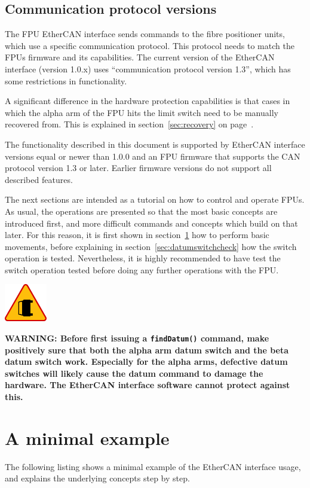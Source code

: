 \documentclass[11pt,a4paper]{report}
\newenvironment{warning}{\begin{framed}\includegraphics[width=5em]{accident-area-ahead.png}
}{\end{framed}}
\begin{document}
\subsection{Communication protocol versions}
 
 The FPU EtherCAN interface
sends commands to the fibre positioner units, which use a specific
communication protocol. This protocol needs to match the FPUs firmware
and its capabilities. The current version of the EtherCAN interface (version
1.0.x) uses ``communication protocol version 1.3'', which has some
restrictions in functionality.

A significant difference in the hardware protection capabilities is
that cases in which the alpha arm of the FPU hits the limit switch
need to be manually recovered from. This is explained in
section~\ref{sec:recovery} on page~\pageref{sec:recovery}.


The functionality described in this document is supported by EtherCAN interface
versions equal or newer than 1.0.0 and an FPU  firmware that supports the
CAN protocol version 1.3 or later. Earlier firmware versions do not
support all described features.

The next sections are intended as a tutorial on how to control and
operate FPUs. As usual, the operations are presented so that the most
basic concepts are introduced first, and more difficult commands and
concepts which build on that later. For this reason, it is first shown
in section~\ref{sec:minimalexample} how to perform basic movements,
before explaining in section~\ref{sec:datumswitchcheck} how the switch
operation is tested. Nevertheless, it is highly recommended to have
test the switch operation tested before doing any further operations
with the FPU.

\begin{warning}
  \textbf{WARNING: Before first issuing a \texttt{findDatum()}
    command, make positively sure that both the alpha arm datum switch
    and the beta datum switch work. Especially for the alpha arms,
    defective datum switches will likely cause the datum command to
    damage the hardware. The EtherCAN interface software cannot protect against
    this.}
\end{warning}


\section{A minimal example}
\label{sec:minimalexample}
The following listing shows a minimal example of the
EtherCAN interface usage, and explains the underlying concepts
step by step.
\end{document}
